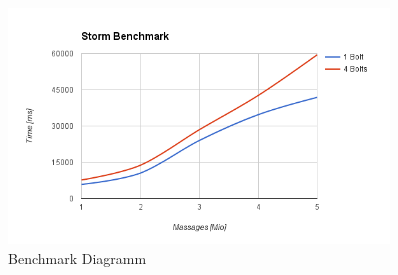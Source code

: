 \begin{figure}[H]
\centering
\captionsetup{justification=centering}
\includegraphics[width=0.9\textwidth]{images/benchmark.png}
\caption[Benchmark Diagramm]{Benchmark Diagramm}
\end{figure}








